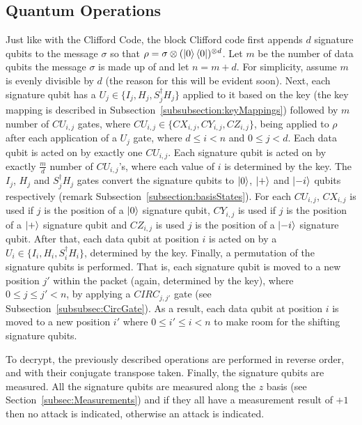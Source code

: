 \subsection{Quantum Operations}
Just like with the Clifford Code, the block Clifford code first appends $d$ signature qubits to the message $\sigma$ so that $\rho = \sigma \otimes (\ket{0}\bra{0})^{\otimes d}$. Let $m$ be the number of data qubits the message $\sigma$ is made up of and let $n = m + d$. For simplicity, assume $m$ is evenly divisible by $d$ (the reason for this will be evident soon). Next, each signature qubit has a $U_j \in \{I_j,H_j,S_j^{\dagger}H_j\}$ applied to it based on the key (the key mapping is described in Subsection~\ref{subsubsection:keyMappings}) followed by $m$ number of $\mathit{CU}_{i,j}$ gates, where $\mathit{CU}_{i,j} \in \{\mathit{CX}_{i,j}, \mathit{CY}_{i,j}, \mathit{CZ}_{i,j}\}$, being applied to $\rho$ after each application of a $U_j$ gate, where $d \leq i < n$ and $0 \leq j < d$. Each data qubit is acted on by exactly one $\mathit{CU}_{i,j}$. Each signature qubit is acted on by exactly $\frac{m}{d}$ number of $\mathit{CU}_{i,j}$'s, where each value of $i$ is determined by the key. The $I_j$, $H_j$ and $S_j^{\dagger}H_j$ gates convert the signature qubits to $\ket{0}$, $\ket{+}$ and $\ket{-i}$ qubits respectively (remark Subsection~\ref{subsection:basisStates}). For each $\mathit{CU}_{i,j}$, $\mathit{CX}_{i,j}$ is used if $j$ is the position of a $\ket{0}$ signature qubit, $\mathit{CY}_{i,j}$ is used if $j$ is the position of a $\ket{+}$ signature qubit and $\mathit{CZ}_{i,j}$ is used $j$ is the position of a $\ket{-i}$ signature qubit. After that, each data qubit at position $i$ is acted on by a $U_i \in \{I_i,H_i,S_i^{\dagger}H_i\}$, determined by the key. Finally, a permutation of the signature qubits is performed. That is, each signature qubit is moved to a new position $j'$ within the packet (again, determined by the key), where $0 \leq j \leq j' < n$,  by applying a $\mathit{CIRC}_{j,j'}$ gate (see Subsection~\ref{subsubsec:CircGate}). As a result, each data qubit at position $i$ is moved to a new position $i'$ where $0 \leq i' \leq i < n$ to make room for the shifting signature qubits.
 
To decrypt, the previously described operations are performed in reverse order, and with their conjugate transpose taken. Finally, the signature qubits are measured. All the signature qubits are measured along the $z$ basis (see Section~\ref{subsec:Measurements}) and if they all have a measurement result of $+1$ then no attack is indicated, otherwise an attack is indicated.

